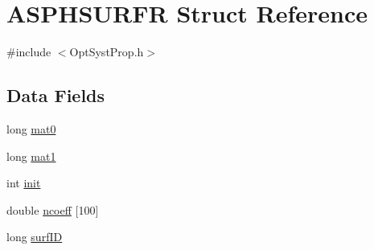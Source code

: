 \hypertarget{structASPHSURFR}{\section{A\+S\+P\+H\+S\+U\+R\+F\+R Struct Reference}
\label{structASPHSURFR}
}


{\ttfamily \#include $<$Opt\+Syst\+Prop.\+h$>$}

\subsection*{Data Fields}
\begin{DoxyCompactItemize}
\item 
long \hyperlink{structASPHSURFR_a9c6a2f637f66b2911129ec69640f98d2}{mat0}
\item 
long \hyperlink{structASPHSURFR_a0f31e31171389f94d70cc4ea0610e2a4}{mat1}
\item 
int \hyperlink{structASPHSURFR_ae2386c06994cf2b5a8090bbdee2a7957}{init}
\item 
double \hyperlink{structASPHSURFR_a08fa1d82f1fc8040b051e608ea915aec}{ncoeff} \mbox{[}100\mbox{]}
\item 
long \hyperlink{structASPHSURFR_a1883e1812b5e228da6efc3fa85b88ff5}{surf\+I\+D}
\end{DoxyCompactItemize}


